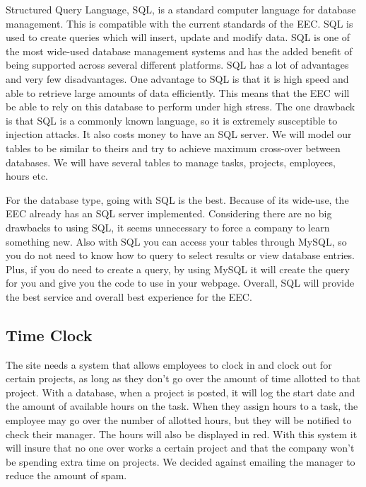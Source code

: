 \documentclass[letterpaper,10pt,titlepage,journal,compsoc,draftclsnofoot,onecolumn]{IEEEtran}
\begin{document}
\par Structured Query Language, SQL, is a standard computer language for database management. This is compatible with the current standards of the EEC. SQL is used to create queries which will insert, update and modify data. SQL is one of the most wide-used database management systems and has the added benefit of being supported across several different platforms. SQL has a lot of advantages and very few disadvantages. One advantage to SQL is that it is high speed and able to retrieve large amounts of data efficiently. This means that the EEC will be able to rely on this database to perform under high stress. The one drawback is that SQL is a commonly known language, so it is extremely susceptible to injection attacks. It also costs money to have an SQL server. We will model our tables to be similar to theirs and try to achieve maximum cross-over between databases. We will have several tables to manage tasks, projects, employees, hours etc. \newline
\par For the database type, going with SQL is the best. Because of its wide-use, the EEC already has an SQL server implemented. Considering there are no big drawbacks to using SQL, it seems unnecessary to force a company to learn something new. Also with SQL you can access your tables through MySQL, so you do not need to know how to query to select results or view database entries. Plus, if you do need to create a query, by using MySQL it will create the query for you and give you the code to use in your webpage. Overall, SQL will provide the best service and overall best experience for the EEC. 

\subsection{Time Clock}

\par The site needs a system that allows employees to clock in and clock out for certain projects, as long as they don't go over the amount of time allotted to that project. With a database, when a project is posted, it will log the start date and the amount of available hours on the task. When they assign hours to a task, the employee may go over the number of allotted hours, but they will be notified to check their manager. The hours will also be displayed in red. With this system it will insure that no one over works a certain project and that the company won't be spending extra time on projects. We decided against emailing the manager to reduce the amount of spam. \newline
\end{document}
